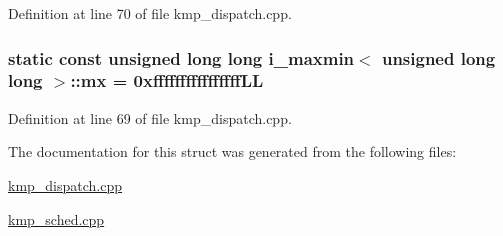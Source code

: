 Definition at line 70 of file kmp\-\_\-dispatch.\-cpp.

\hypertarget{structi__maxmin_3_01unsigned_01long_01long_01_4_a348b4c66fff0c3771110fa98d07e570f}{
\subsubsection[{mx}]{\setlength{\rightskip}{0pt plus 5cm}static const unsigned long long {\bf i\-\_\-maxmin}$<$ unsigned long long $>$\-::mx = 0xffffffffffffffff\-L\-L\hspace{0.3cm}{\ttfamily [static]}}}\label{structi__maxmin_3_01unsigned_01long_01long_01_4_a348b4c66fff0c3771110fa98d07e570f}


Definition at line 69 of file kmp\-\_\-dispatch.\-cpp.



The documentation for this struct was generated from the following files\-:\begin{DoxyCompactItemize}
\item 
\hyperlink{kmp__dispatch_8cpp}{kmp\-\_\-dispatch.\-cpp}\item 
\hyperlink{kmp__sched_8cpp}{kmp\-\_\-sched.\-cpp}\end{DoxyCompactItemize}
